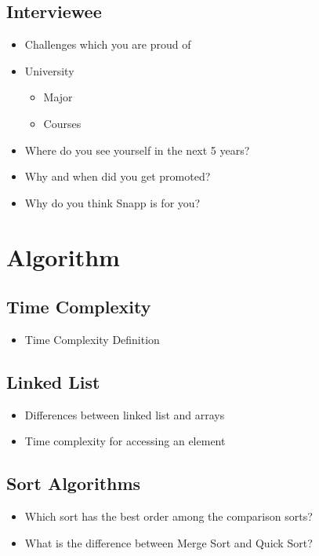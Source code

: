 \documentclass[]{article}
\begin{document}
\begin{multicols}{2}
\subsection{Interviewee}

\begin{itemize}
  \item Challenges which you are proud of
  \item University
  \begin{itemize}
    \item Major
    \item Courses
  \end{itemize}
  \item Where do you see yourself in the next 5 years?
  \item Why and when did you get promoted?
  \item Why do you think Snapp is for you?
\end{itemize}

\section{Algorithm}

\subsection{Time Complexity}

\begin{itemize}
  \item Time Complexity Definition
\end{itemize}

\subsection{Linked List}

\begin{itemize}
  \item Differences between linked list and arrays
  \item Time complexity for accessing an element
\end{itemize}

\subsection{Sort Algorithms}

\begin{itemize}
  \item Which sort has the best order among the comparison sorts?
  \item What is the difference between Merge Sort and Quick Sort?
\end{itemize}


\end{multicols}
\end{document}
